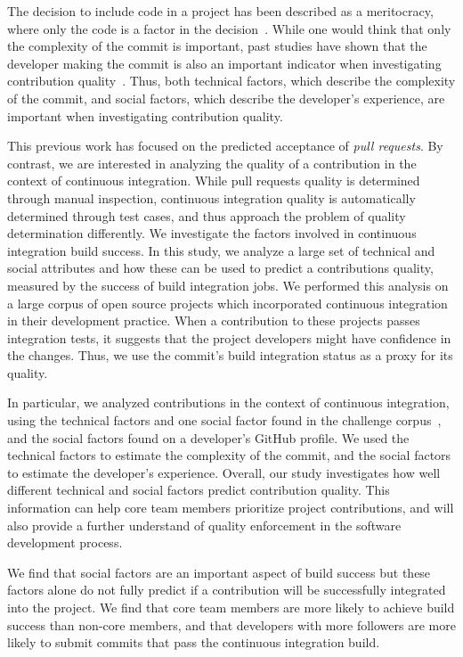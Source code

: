 \documentclass[10pt, conference]{IEEEtran}
\begin{document}
The decision to include code in
a project has been described as a meritocracy, where only the code is a factor
in the decision~\cite{Scacchi07}.
While one would think that only the complexity of the commit is important, past
studies have shown that the developer making the commit is also an important
indicator when investigating contribution quality~\cite{tsay14icse, tsay14fse}.
Thus, both technical factors, which describe the complexity of the commit, and
social factors, which describe the developer's experience, are important when
investigating contribution quality.

This previous work has focused on the predicted acceptance of \emph{pull requests}. 
By contrast,  we are interested in analyzing the quality 
of a contribution in the context of continuous integration.  While pull requests
quality is determined through manual inspection, continuous integration quality
is automatically determined through test cases, and thus approach the problem of
quality determination differently.
We investigate the factors involved in continuous integration build success.
In this study, we analyze a large set of technical and social attributes 
and how these can be used to predict a contributions quality, measured by the
success of build integration jobs.
We performed this analysis on a large corpus of open source projects
which incorporated continuous integration in their development practice. 
When a contribution to these projects passes integration tests, 
it suggests that the project developers
might have confidence in the changes. 
Thus, we use the commit's build integration status as a proxy for its quality.

In particular, we analyzed contributions in the 
context of continuous integration, using the technical factors and one social
factor found in the challenge
corpus~\cite{msr17challenge}, and the social factors found on a developer's
GitHub profile.  We used the technical factors to estimate the complexity of the
commit, and the social factors to estimate the developer's experience.
Overall, our study investigates how well different technical and social factors predict
contribution quality. This information can help core team members prioritize project
contributions, and will also provide a further understand of quality enforcement
in the software development process.

We find that social factors are an important aspect of build success but
these factors alone do not fully predict if a contribution will be successfully 
integrated into the project. We find
that core team members are more likely to achieve build success than non-core
members, and that developers with more followers are more likely to submit commits that pass the
continuous integration build.
\end{document}
